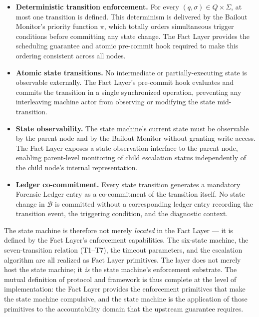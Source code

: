\begin{itemize}\itemsep=0pt
\item \textbf{Deterministic transition enforcement.} For every $(q, \sigma) \in Q \times \Sigma$, at most one transition is defined. This determinism is delivered by the Bailout Monitor's priority function $\pi$, which totally orders simultaneous trigger conditions before committing any state change. The Fact Layer provides the scheduling guarantee and atomic pre-commit hook required to make this ordering consistent across all nodes.

\item \textbf{Atomic state transitions.} No intermediate or partially-executing state is observable externally. The Fact Layer's pre-commit hook evaluates and commits the transition in a single synchronized operation, preventing any interleaving machine actor from observing or modifying the state mid-transition.

\item \textbf{State observability.} The state machine's current state must be observable by the parent node and by the Bailout Monitor without granting write access. The Fact Layer exposes a state observation interface to the parent node, enabling parent-level monitoring of child escalation status independently of the child node's internal representation.

\item \textbf{Ledger co-commitment.} Every state transition generates a mandatory Forensic Ledger entry as a co-commitment of the transition itself. No state change in $\mathcal{B}$ is committed without a corresponding ledger entry recording the transition event, the triggering condition, and the diagnostic context.
\end{itemize}

The state machine is therefore not merely \emph{located} in the Fact Layer --- it is defined by the Fact Layer's enforcement capabilities. The six-state machine, the seven-transition relation (T1--T7), the timeout parameters, and the escalation algorithm are all realized as Fact Layer primitives. The \fact{} layer does not merely host the state machine; it \emph{is} the state machine's enforcement substrate. The mutual definition of protocol and framework is thus complete at the level of implementation: the Fact Layer provides the enforcement primitives that make the state machine compulsive, and the state machine is the application of those primitives to the accountability domain that the upstream guarantee requires.

